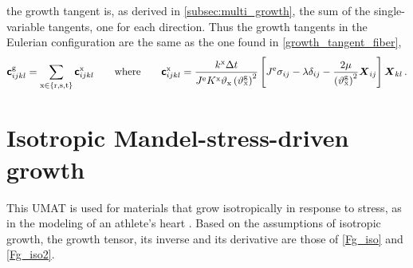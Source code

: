 \documentclass[10pt,letterpaper,oneside]{report}
\newcommand{\ten}[1]{\mbox{\boldmath $#1$}{}}
\newcommand{\tenf}[1]{\mbox{{\sffamily{\bfseries {#1}}}}}
\newcommand{\scas}[1]{\mbox{{\scriptsize{${\rm{#1}}$}}}{}}
\begin{document}
the growth tangent is, as derived in \autoref{subsec:multi_growth}, the sum of the single-variable tangents, one for each direction.  Thus the growth tangents in the Eulerian configuration are the same as the one found in \autoref{growth_tangent_fiber},
\begin{equation}
\tenf{c}^{\scas{g}}_{ijkl} = \sum_{\scas{x} \in \lbrace \scas{r}, \scas{s}, \scas{t} \rbrace} \tenf{c}^{\scas{x}}_{ijkl}
\qquad \text{where} \qquad
\tenf{c}^{\scas{x}}_{ijkl} = \frac{k^{\scas{x}} \Delta t}{J^{\scas{e}} K^{\scas{x}} \vartheta_{\scas{x}} \left( \vartheta^{\scas{g}}_{\scas{x}} \right)^2 } 
\left[ J^{\scas{e}} \sigma_{ij} - \lambda \delta_{ij} - \frac{2 \mu}{\left( \vartheta^{\scas{g}}_{\scas{x}} \right)^2} \ten{X}_{ij} \right] 
\ten{X}_{kl} \, . 
\end{equation}


\section{Isotropic Mandel-stress-driven growth}

This UMAT is used for materials that grow isotropically in response to stress, as in the modeling of an athlete's heart \autocite{Goktepe2010}.  Based on the assumptions of isotropic growth, the growth tensor, its inverse and its derivative are those of \autoref{Fg_iso} and \autoref{Fg_iso2}.
\end{document}
